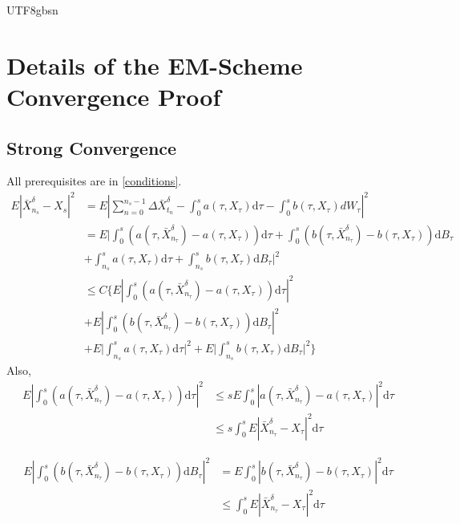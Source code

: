 \documentclass{article}
\begin{document}
\begin{CJK*}{UTF8}{gbsn}
\section{Details of the EM-Scheme Convergence Proof\label{appendixB}}
\subsection{Strong Convergence}
All prerequisites are in \ref{conditions}.
$$
\begin{aligned}
E\left|\bar{X}_{n_{s}}^{\delta}-X_{s}\right|^{2}
&=E\left|\sum_{n=0}^{n_{s}-1}\Delta\bar{X}_{t_n}^{\delta}-\int_{0}^{s}a\left(\tau,X_{\tau}\right)\mathrm{d}\tau-\int_{0}^{s}b\left(\tau,X_{\tau}\right)dW_{\tau}\right|^2 \\
&=E\Bigg|\int_{0}^{s}\left(a(\tau,\bar{X}_{n_\tau}^{\delta})-a(\tau,X_{\tau})\right)\mathrm{d}\tau+\int_{0}^{s}\left(b(\tau,\bar{X}_{n_\tau}^{\delta})-b(\tau,X_{\tau})\right)\mathrm{d}B_{\tau}\\
&+\int_{n_{s}}^{s}a(\tau,X_{\tau})\mathrm{d}\tau+\int_{n_{s}}^{s}b(\tau,X_{\tau})\mathrm{d}B_{\tau}\Bigg|^{2} \\
&\le C\Bigg\{
E\left|\int_{0}^{s}\left(a(\tau,\bar{X}_{n_\tau}^{\delta})-a(\tau,X_{\tau})\right)\mathrm{d}\tau\right|^2\\
&+E\left|\int_{0}^{s}\left(b(\tau,\bar{X}_{n_\tau}^{\delta})-b(\tau,X_{\tau})\right)\mathrm{d}B_\tau\right|^2\\
&+E\Bigg|\int_{n_{s}}^{s}a(\tau,X_{\tau})\mathrm{d}\tau\Bigg|^{2} +E\Bigg|\int_{n_{s}}^{s}b(\tau,X_{\tau})\mathrm{d}B_{\tau}\Bigg|^{2} 
\Bigg\}
\end{aligned}
$$
Also,
$$\begin{aligned}
E\left|\int_{0}^{s}\left(a(\tau,\bar{X}_{n_\tau}^{\delta})-a(\tau,X_{\tau})\right)\mathrm{d}\tau\right|^2
&\le sE\int_0^s\left|a(\tau,\bar{X}_{n_\tau}^{\delta})-a(\tau,X_{\tau})\right|^2\mathrm{d}\tau\\
&\le
s\int_0^sE\left|\bar{X}_{n_\tau}^{\delta}-X_{\tau}\right|^2\mathrm{d}\tau
\end{aligned}$$

$$\begin{aligned}
E\left|\int_{0}^{s}\left(b(\tau,\bar{X}_{n_\tau}^{\delta})-b(\tau,X_{\tau})\right)\mathrm{d}B_\tau\right|^2
&=
E\int_0^s\left|b(\tau,\bar{X}_{n_\tau}^{\delta})-b(\tau,X_{\tau})\right|^2\mathrm{d}\tau\\
&\le
\int_0^sE\left|\bar{X}_{n_\tau}^{\delta}-X_{\tau}\right|^2\mathrm{d}\tau
\end{aligned}$$


\end{CJK*}
\end{document}

